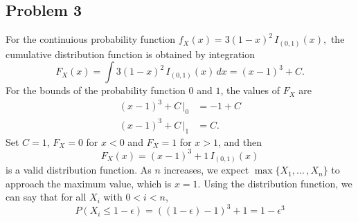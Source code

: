 \documentclass{article}
\begin{document}
\subsection*{Problem 3}
For the continuious probability function $f_X(x) = 3(1-x)^2\,I_{(0,1)}(x),$ the cumulative distribution function is obtained by integration \[F_X(x) = \int 3(1-x)^2\,I_{(0,1)}(x)\,dx = (x-1)^3 + C.\] For the bounds of the probability function $0$ and $1$, the values of $F_X$ are 
\[\begin{aligned}
(x-1)^3 + C\,\big|_0 &= -1 + C \\
(x-1)^3 + C\,\big|_1 &= C.
\end{aligned}\]
Set $C = 1$, $F_X = 0$ for $x < 0$ and $F_X = 1$ for $x > 1$, and then 
\[F_X(x) = (x-1)^3 + 1\,I_{(0,1)}(x)\] is a valid distribution function. As $n$ increases, we expect $\max\{X_1, ...\,, X_n\}$ to approach the maximum value, which is $x = 1$. Using the distribution function, we can say that for all $X_i$ with $0<i<n$,
\[ P(X_i \leq 1 - \epsilon) = \left((1-\epsilon)-1\right)^3+1 = 1 - \epsilon^3\]


\iffalse
We can now use Theorem 5.4.4 from the textbook to find an expression for the probability function of $\max\{X_1, ...\,, X_n\}$, the $n$-th order statistic of $X$:
\[\begin{aligned}
f_{X_{(n)}}(x) &= \frac{n!}{(n-1)!(n-n)!}f_X(x)\left[F_X(x)\right]^{n-1}\left[1-F_X(x)\right]^{n-n} \\
&= n\,f_X(x)\left[F_X(x)\right]^{n-1} \\
&= n\left(3(1-x)^2\right)\left[(x-1)^3 + 1\right]^{n-1}I_{(0,1)}(x)
\end{aligned}\]

On the domain $0<x<1$. We can find an expression for \[T_n = n^{1/3}\left(1-n\,f_X(x)\left[F_X(x)\right]^{n-1}.\right)\] While considering the limit with respect to $n$ of this function, it is important to note that $F_X \leq 1$ for all $x$ in the domain since it is a distribution function; therefore, $\left[F_X(x)\right]^{n-1}$ tends to zero as $n$ tends to infinity.
\fi
\end{document}
